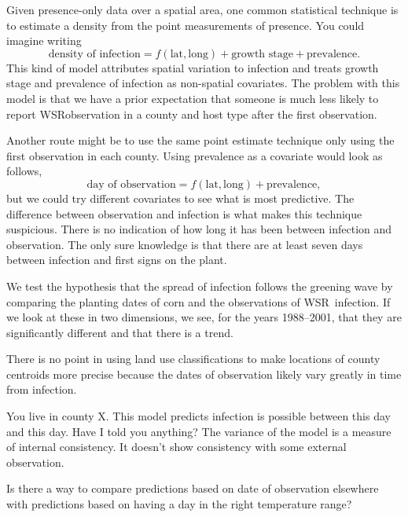 \documentclass{article}
\newcommand{\wsr}{\textsc{WSR}}
\begin{document}
Given presence-only data over a spatial area, one common statistical technique is to estimate a density from the point measurements of presence. You could imagine writing
\begin{equation}
  \mbox{density of infection} = f(\mbox{lat},\mbox{long}) + \mbox{growth stage} + \mbox{prevalence}.
\end{equation}
This kind of model attributes spatial variation to infection and treats growth stage and prevalence of infection as non-spatial covariates. The problem with this model is that we have a prior expectation that someone is much less likely to report \wsr observation in a county and host type after the first observation.

Another route might be to use the same point estimate technique only using the first observation in each county. Using prevalence as a covariate would look as follows,
\begin{equation}
  \mbox{day of observation} = f(\mbox{lat},\mbox{long}) + \mbox{prevalence},
\end{equation}
but we could try different covariates to see what is most predictive.
The difference between observation and infection is what makes this technique suspicious. There is no indication of how long it has been between infection and observation. The only sure knowledge is that there are at least seven days between infection and first signs on the plant.

We test the hypothesis that the spread of infection follows the greening wave by comparing the planting dates of corn and the observations of \wsr\ infection. If we look at these in two dimensions, we see, for the years 1988--2001, that they are significantly different and that there is a trend.

There is no point in using land use classifications to make locations of county centroids more precise because the dates of observation likely vary greatly in time from infection.

You live in county X. This model predicts infection is possible between this day and this day. Have I told you anything? The variance of the model is a measure of internal consistency. It doesn't show consistency with some external observation.

Is there a way to compare predictions based on date of observation elsewhere with predictions based on having a day in the right temperature range?
\end{document}
